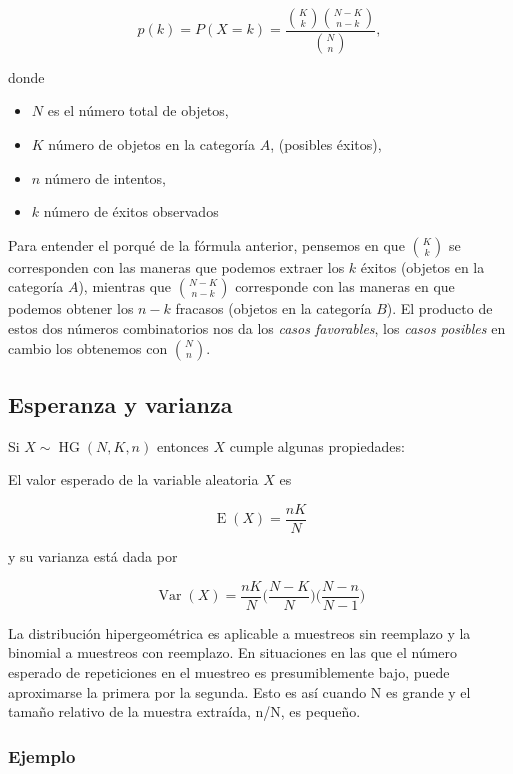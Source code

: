 \documentclass[]{book}
\providecommand{\tightlist}{%
  \setlength{\itemsep}{0pt}\setlength{\parskip}{0pt}}
\theoremstyle{plain}
\theoremstyle{definition}
\theoremstyle{definition} %
\begin{document}
\[\displaystyle p(k)=P(X=k)={\frac {{\binom {K}{k}}{\binom {N-K}{n-k}}}{\binom {N}{n}}},\]

donde

\begin{itemize}
\tightlist
\item
  \(N\) es el número total de objetos,
\item
  \(K\) número de objetos en la categoría \(A\), (posibles éxitos),
\item
  \(n\) número de intentos,
\item
  \(k\) número de éxitos observados
\end{itemize}

Para entender el porqué de la fórmula anterior, pensemos en que
\({\binom {K}{k}}\) se corresponden con las maneras que podemos extraer
los \(k\) éxitos (objetos en la categoría \(A\)), mientras que
\({\binom {N-K}{n-k}}\) corresponde con las maneras en que podemos
obtener los \(n-k\) fracasos (objetos en la categoría \(B\)). El
producto de estos dos números combinatorios nos da los \emph{casos
favorables}, los \emph{casos posibles} en cambio los obtenemos con
\({\binom {N}{n}}\).

\hypertarget{esperanza-y-varianza-1}{%
\subsection{Esperanza y varianza}\label{esperanza-y-varianza-1}}

Si \(\displaystyle X\sim \operatorname {HG} (N,K,n)\) entonces \(X\)
cumple algunas propiedades:

El valor esperado de la variable aleatoria \(X\) es

\[\displaystyle \operatorname {E} (X)={\frac {nK}{N}}\]

y su varianza está dada por

\[\displaystyle \operatorname {Var} (X)={\frac {nK}{N}}{\bigg (}{\frac {N-K}{N}}{\bigg )}{\bigg (}{\frac {N-n}{N-1}}{\bigg )}\]

La distribución hipergeométrica es aplicable a muestreos sin reemplazo y
la binomial a muestreos con reemplazo. En situaciones en las que el
número esperado de repeticiones en el muestreo es presumiblemente bajo,
puede aproximarse la primera por la segunda. Esto es así cuando N es
grande y el tamaño relativo de la muestra extraída, n/N, es pequeño.

\hypertarget{ejemplo-6}{%
\subsubsection{Ejemplo}\label{ejemplo-6}}
\end{document}
